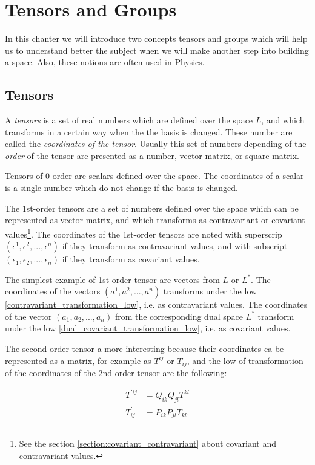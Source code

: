 \documentclass{book}
\begin{document}
\chapter{Tensors and Groups}

In this chanter we will introduce two concepts tensors and groups which will help us to understand better the subject when we will make another step into building a space. Also, these notions are often used in Physics.

\section{Tensors}

A \emph{tensors} is a set of real numbers which are defined over the space $L$, and which transforms in a certain way when the the basis is changed. These number are called the \emph{coordinates of the tensor}. Usually this set of numbers depending of the \emph{order} of the tensor are presented as a number, vector matrix, or square matrix.

Tensors of 0-order are scalars defined over the space. The coordinates of a scalar is a single number which do not change if the basis is changed.

The 1st-order tensors are a set of numbers defined over the space which can be represented as vector matrix, and which transforms as contravariant or covariant values\footnote{See the section \ref{section:covariant_contravariant} about covariant and contravariant values.}. The coordinates of the 1st-order tensors are noted with superscrip $(\epsilon^1, \epsilon^2,...,\epsilon^n)$ if they transform as contravariant values, and with subscript $(\epsilon_1, \epsilon_2,...,\epsilon_n)$ if they transform as covariant values.

The simplest example of 1st-order tensor are vectors from $L$ or $L^*$. The coordinates of the vectors $(a^1, a^2, ..., a^n)$ transforms under the low \eqref{contravariant_transformation_low}, i.e. as contravariant values. The coordinates of the vector $(a_1, a_2, ..., a_n)$ from the corresponding dual space $L^*$ transform under the low \eqref{dual_covariant_transformation_low}, i.e. as covariant values.

The second order tensor a more interesting because their coordinates ca be represented as a matrix, for example as $T^{ij}$ or $T_{ij}$, and the low of transformation of the coordinates of the 2nd-order tensor are the following:

\begin{align}
{T^{'ij}} &= Q_{ik}Q_{jl}T^{kl} \\ 
T^{'}_{ij} &= P_{ik}P_{jl}T_{kl}. \label{2nd_cov_tensor_transform}
\end{align}
\end{document}

